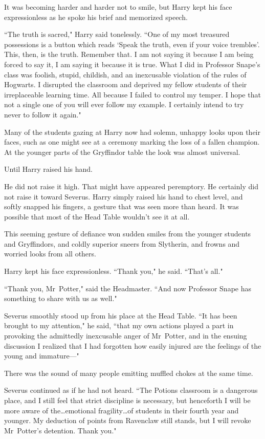 It was becoming harder and harder not to smile, but Harry kept his face expressionless as he spoke his brief and memorized speech.

``The truth is sacred," Harry said tonelessly. ``One of my most treasured possessions is a button which reads `Speak the truth, even if your voice trembles'. This, then, is the truth. Remember that. I am not saying it because I am being forced to say it, I am saying it because it is true. What I did in Professor Snape's class was foolish, stupid, childish, and an inexcusable violation of the rules of Hogwarts. I disrupted the classroom and deprived my fellow students of their irreplaceable learning time. All because I failed to control my temper. I hope that not a single one of you will ever follow my example. I certainly intend to try never to follow it again."

Many of the students gazing at Harry now had solemn, unhappy looks upon their faces, such as one might see at a ceremony marking the loss of a fallen champion. At the younger parts of the Gryffindor table the look was almost universal.

Until Harry raised his hand.

He did not raise it high. That might have appeared peremptory. He certainly did not raise it toward Severus. Harry simply raised his hand to chest level, and softly snapped his fingers, a gesture that was seen more than heard. It was possible that most of the Head Table wouldn't see it at all.

This seeming gesture of defiance won sudden smiles from the younger students and Gryffindors, and coldly superior sneers from Slytherin, and frowns and worried looks from all others.

Harry kept his face expressionless. ``Thank you," he said. ``That's all."

``Thank you, Mr~Potter," said the Headmaster. ``And now Professor Snape has something to share with us as well."

Severus smoothly stood up from his place at the Head Table. ``It has been brought to my attention," he said, ``that my own actions played a part in provoking the admittedly inexcusable anger of Mr~Potter, and in the ensuing discussion I realized that I had forgotten how easily injured are the feelings of the young and immature—"

There was the sound of many people emitting muffled chokes at the same time.

Severus continued as if he had not heard. ``The Potions classroom is a dangerous place, and I still feel that strict discipline is necessary, but henceforth I will be more aware of the…emotional fragility…of students in their fourth year and younger. My deduction of points from Ravenclaw still stands, but I will revoke Mr~Potter's detention. Thank you."

